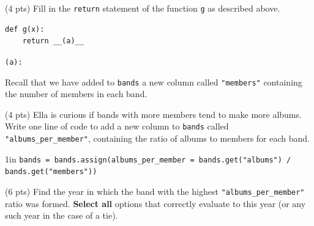 \documentclass[twoside,12pt]{article}
\begin{document}
\begin{probset}
\begin{prob}[(14 pts)]
\begin{subprobset}
\begin{subprob} (4 pts) 
Fill in the \texttt{return} statement of the function \texttt{g} as described above.
\begin{verbatim}
def g(x):
    return __(a)__
\end{verbatim}

\texttt{(a):} 
\end{subprob}

\end{subprobset}


\end{prob}

\newpage
\begin{prob}[(10 pts)]

Recall that we have added to \texttt{bands} a new column called \texttt{"members"} containing the number of members in each band.

\begin{subprobset}
\begin{subprob}(4 pts)
Ella is curious if bands with more members tend to make more albums. Write one line of code to add a new column to \texttt{bands} called \texttt{"albums\_per\_member"},
containing the ratio of albums to members for each band.

\smallskip
\begin{responsebox}{1in}
\texttt{bands = bands.assign(albums\_per\_member = bands.get("albums") / bands.get("members"))}
\end{responsebox}
\end{subprob}

\bigskip

\begin{subprob} (6 pts) 
Find the year in which the band with the highest \texttt{"albums\_per\_member"} ratio was formed. \textbf{Select all} options that correctly evaluate to this year (or any such year in the case of a tie).

\bigskip
{}

\smallskip
{}


\end{subprob}
\end{subprobset}
\end{prob}
\end{probset}
\end{document}
